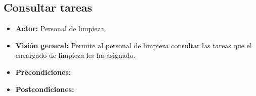 \documentclass[spanish,a4paper,11pt, twoside]{report}	%
\begin{document}

	\hspace{1 true cm}
	\subsection{Consultar tareas}				
			\begin{itemize}
				\item \textbf{Actor:} Personal de limpieza.
				\item \textbf{Visión general:} Permite al personal de limpieza consultar las tareas que el encargado de limpieza les ha asignado. 		
			\item \textbf{Precondiciones:} 
			\item \textbf{Postcondiciones:} 
			\end {itemize}


	
\end{document}
